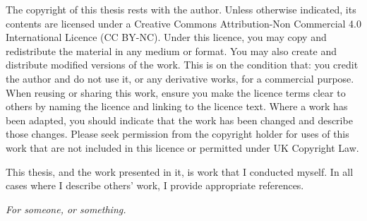 \documentclass[a4paper, nobind]{templates/ociamthesis}
\begin{document}
\setcounter{secnumdepth}{2}
\setcounter{tocdepth}{1}



\begin{romanpages}

\maketitle

\begin{copyrights}
  The copyright of this thesis rests with the author. Unless otherwise indicated, its contents are licensed under a Creative Commons Attribution-Non Commercial 4.0 International Licence (CC BY-NC).
  Under this licence, you may copy and redistribute the material in any medium or format. You may also create and distribute modified versions of the work.
  This is on the condition that: you credit the author and do not use it, or any derivative works, for a commercial purpose.
  When reusing or sharing this work, ensure you make the licence terms clear to others by naming the licence and linking to the licence text.
  Where a work has been adapted, you should indicate that the work has been changed and describe those changes.
  Please seek permission from the copyright holder for uses of this work that are not included in this licence or permitted under UK Copyright Law.
\end{copyrights}

\begin{originality}
  This thesis, and the work presented in it, is work that I conducted myself.
  In all cases where I describe others' work, I provide appropriate references.
\end{originality}

\begin{dedication}
  \textit{For someone, or something.}
\end{dedication}


\end{romanpages}
\end{document}
